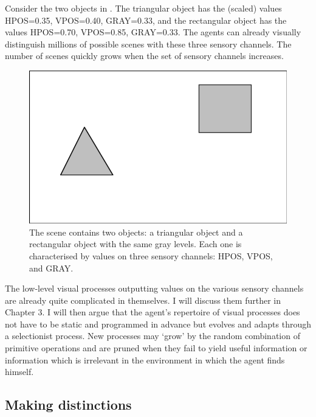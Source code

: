 Consider the two objects in . The triangular
object has the (scaled) values HPOS=0.35, VPOS=0.40, GRAY=0.33, and 
the rectangular object has the values HPOS=0.70, VPOS=0.85, 
GRAY=0.33. The agents can already visually distinguish
millions of possible scenes with these three sensory
channels. The number of scenes
quickly grows when the set of sensory channels increases. 

\begin{figure}[htbp]
  \centerline{\includegraphics[width=.50\textwidth]{chap2/figs/scene1-1}}
\caption{\label{scene1-1} The scene contains two 
objects: a triangular object and a rectangular object
with the same gray levels. 
Each one is characterised by values on three sensory 
channels: HPOS, VPOS, and GRAY.}
\end{figure}

The low-level visual processes outputting
values on the various sensory channels are already quite
complicated in themselves. I will discuss them further in 
Chapter 3. I will then argue that the 
agent's repertoire of visual processes does not have to be
static and programmed in advance but evolves and adapts
through a selectionist process. New processes may `grow'
by the random combination of primitive operations and are
pruned when they fail to yield useful information or information 
which is irrelevant in the environment in which the agent 
finds himself. 

\subsection{Making distinctions}

